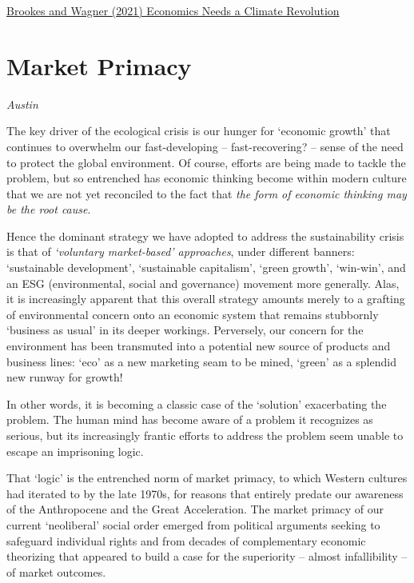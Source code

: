 \documentclass[
]{book}
\begin{document}
\href{https://www.project-syndicate.org/commentary/neoclassical-economics-fails-with-climate-change-by-tom-brookes-and-gernot-wagner-2021-06}{Brookes and Wagner (2021) Economics Needs a Climate Revolution}

\hypertarget{market-primacy}{%
\section{Market Primacy}\label{market-primacy}}

\emph{Austin}

The key driver of the ecological crisis is our hunger for `economic growth' that continues to overwhelm our fast-developing -- fast-recovering? -- sense of the need to protect the global environment. Of course, efforts are being made to tackle the problem, but so entrenched has economic thinking become within modern culture that we are not yet reconciled to the fact that \emph{the form of economic thinking may be the root cause}.

Hence the dominant strategy we have adopted to address the sustainability crisis is that of \emph{`voluntary market-based' approaches}, under different banners: `sustainable development', `sustainable capitalism', `green growth', `win-win', and an ESG (environmental, social and governance) movement more generally. Alas, it is increasingly apparent that this overall strategy amounts merely to a grafting of environmental concern onto an economic system that remains stubbornly `business as usual' in its deeper workings. Perversely, our concern for the environment has been transmuted into a potential new source of products and business lines: `eco' as a new marketing seam to be mined, `green' as a splendid new runway for growth!

In other words, it is becoming a classic case of the `solution' exacerbating the problem.
The human mind has become aware of a problem it recognizes as serious, but its increasingly frantic efforts to address the problem seem unable to escape an imprisoning logic.

That `logic' is the entrenched norm of market primacy, to which Western cultures had iterated to by the late 1970s, for reasons that entirely predate our awareness of the Anthropocene and the Great Acceleration. The market primacy of our current `neoliberal' social order emerged from political arguments seeking to safeguard individual rights and from decades of complementary economic theorizing that appeared to build a case for the superiority -- almost infallibility -- of market outcomes.
\end{document}
